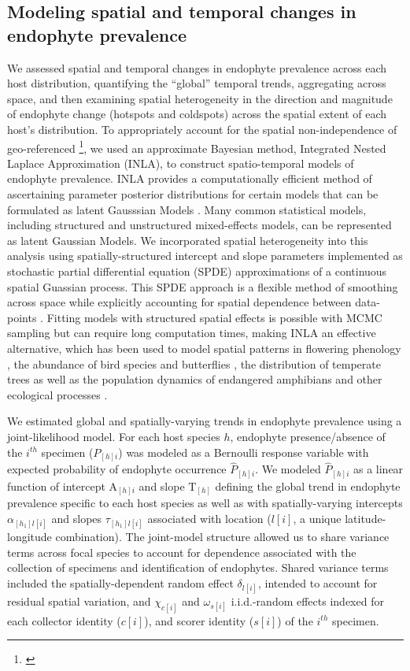 \documentclass[11pt]{article}
\let\cite\citep
\newcommand{\josh}[2]{{\color{orange}{#1}}\footnote{\textit{\color{orange}{#2}}}}
\begin{document}
\subsection*{Modeling spatial and temporal changes in endophyte prevalence}
We assessed spatial and temporal changes in endophyte prevalence across each host distribution, quantifying the ``global'' temporal trends, aggregating across space, and then examining spatial heterogeneity in the direction and magnitude of endophyte change (hotspots and coldspots) across the spatial extent of each host's distribution.
To appropriately account for the spatial non-independence of geo-referenced \josh{occurrences}{spelling?}, we used an approximate Bayesian method, Integrated Nested Laplace Approximation (INLA), to construct spatio-temporal models of endophyte prevalence.
INLA provides a computationally efficient method of ascertaining parameter posterior distributions for certain models that can be formulated as latent Gausssian Models \cite{rue2009approximate}.
Many common statistical models, including structured and unstructured mixed-effects models, can be represented as latent Gaussian Models.
We incorporated spatial heterogeneity into this analysis using spatially-structured intercept and slope parameters implemented as stochastic partial differential equation (SPDE) approximations of a continuous spatial Guassian process. 
This SPDE approach is a flexible method of smoothing across space while explicitly accounting for spatial dependence between data-points \citep{lindgren2011explicit,bakka2018spatial}.
Fitting models with structured spatial effects is possible with MCMC sampling but can require long computation times, making INLA an effective alternative, which has been used to model spatial patterns in flowering phenology \cite{willems2022forest}, the abundance of bird species \cite{meehan2019spatial} and butterflies \cite{crossley2022opposing}, the distribution of temperate trees \cite{engel2022spatial} as well as the population dynamics of endangered amphibians \cite{knapp2016large} and other ecological processes \cite{beguin2012hierarchical}.

We estimated global and spatially-varying trends in endophyte prevalence using a joint-likelihood model. 
For each host species $h$, endophyte presence/absence of the $i^{th}$ specimen ($P_{[h]i}$) was modeled as a Bernoulli response variable with expected probability of endophyte occurrence $\hat{P}_{[h]i}$.
We modeled $\hat{P}_{[h]i}$ as a linear function of intercept $ \mathrm{A}_{[h]i}$ and slope $\mathrm{T}_{[h]}$ defining the global trend in endophyte prevalence specific to each host species as well as with spatially-varying intercepts $\alpha_{[h_{1}]l[i]}$ and slopes $\tau_{[h_{1}]l[i]}$ associated with location ($l[i]$, a unique latitude-longitude combination).
The joint-model structure allowed us to share variance terms across focal species to account for dependence associated with the collection of specimens and identification of endophytes. 
Shared variance terms included the spatially-dependent random effect $\delta_{l[i]}$, intended to account for residual spatial variation, and $\chi_{c[i]}$ and $\omega_{s[i]}$ i.i.d.-random effects indexed for each collector identity ($c[i]$), and scorer identity ($s[i]$) of the $i^{th}$ specimen.
\end{document}
